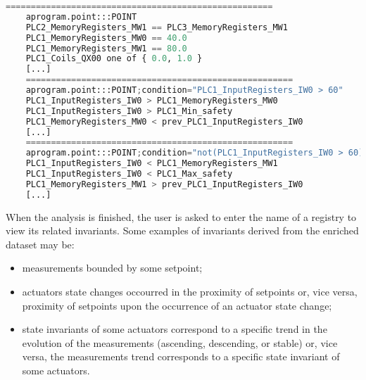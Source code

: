 \begin{lstlisting}[language=Python,numbers=none,caption={The three sections of Daikon analysis outcomes},label=lst:3_daikon_sections]
	=====================================================
	aprogram.point:::POINT
	PLC2_MemoryRegisters_MW1 == PLC3_MemoryRegisters_MW1
	PLC1_MemoryRegisters_MW0 == 40.0
	PLC1_MemoryRegisters_MW1 == 80.0
	PLC1_Coils_QX00 one of { 0.0, 1.0 }
	[...]
	=====================================================
	aprogram.point:::POINT;condition="PLC1_InputRegisters_IW0 > 60"
	PLC1_InputRegisters_IW0 > PLC1_MemoryRegisters_MW0
	PLC1_InputRegisters_IW0 > PLC1_Min_safety
	PLC1_MemoryRegisters_MW0 < prev_PLC1_InputRegisters_IW0
	[...]
	=====================================================
	aprogram.point:::POINT;condition="not(PLC1_InputRegisters_IW0 > 60)"
	PLC1_InputRegisters_IW0 < PLC1_MemoryRegisters_MW1
	PLC1_InputRegisters_IW0 < PLC1_Max_safety
	PLC1_MemoryRegisters_MW1 > prev_PLC1_InputRegisters_IW0
	[...]
\end{lstlisting}
When the analysis is finished, the user is asked to enter the name of a registry to view its related invariants.\newline \newline
Some examples of invariants derived from the enriched dataset may be:

\begin{itemize}
	\item measurements bounded by some setpoint;
	
	\item actuators state changes occourred in the proximity of setpoints or, vice versa, proximity of setpoints upon the occurrence of an actuator state change;
	
	\item state invariants of some actuators correspond to a specific trend in the evolution of the measurements (ascending, descending, or stable) or, vice versa, the measurements trend corresponds to a specific state invariant of some actuators.
\end{itemize}

